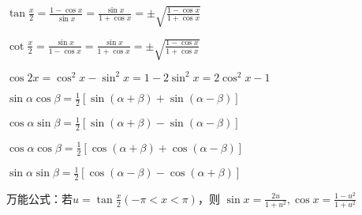 \begin{spacing}{\hangju}
    \noindent $\tan{ \frac{x}{2} } = \frac{ 1-\cos{x} }{ \sin{x} }=\frac{\sin{x}}{1+\cos{x}}=\pm\sqrt{\frac{1-\cos{x}}{1+\cos{x}}}$

    \noindent $\cot{\frac{x}{2}}=\frac{\sin{x}}{1-\cos{x}}=\frac{\sin{x}}{1+\cos{x}}=\pm\sqrt{\frac{1-\cos{x}}{1+\cos{x}}}$

    \noindent $\cos{2x}=\cos^2{x}-\sin^2{x}=1-2\sin^2{x}=2\cos^2{x}-1$

    \noindent $\sin{\alpha}\cos{\beta}=\frac{1}{2}[\sin{(\alpha+\beta)}+\sin{(\alpha-\beta)}]$

    \noindent $\cos{\alpha}\sin{\beta}=\frac{1}{2}[\sin{(\alpha+\beta)}-\sin{(\alpha-\beta)}]$

    \noindent $\cos{\alpha}\cos{\beta}=\frac{1}{2}[\cos{(\alpha+\beta)}+\cos{(\alpha-\beta)}]$

    \noindent $\sin{\alpha}\sin{\beta} =
        \frac{1}{2}[\cos{(\alpha-\beta)}-\cos{(\alpha+\beta)}]$

    \noindent 万能公式：若$u=\tan{\frac{x}{2}}(-\pi<x<\pi)$，则
        $\sin{x}=\frac{2u}{1+u^2}, \cos{x}=\frac{1-u^2}{1+u^2}$

\end{spacing}